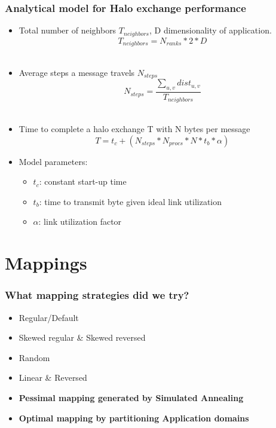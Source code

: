 \documentclass{beamer}
\begin{document}
\begin{frame}[shrink=5]
\frametitle{Analytical model for Halo exchange performance}
\begin{itemize}
\item Total number of neighbors $T_{neighbors}$, D dimensionality of application.
\begin{equation}
  T_{neighbors} = N_{ranks} * 2 * D
\end{equation} \\
\item Average steps a message travels $N_{steps}$
\begin{equation}
  N_{steps} = \frac{ \sum\limits_{u,v} dist_{u,v} } {T_{neighbors}}
\end{equation} \\
\item Time to complete a halo exchange T with N bytes per message
\begin{equation}
  T = t_c + (N_{steps} * N_{procs} * N * t_b * \alpha)
\end{equation}
\item Model parameters:
\begin{itemize}
  \item $t_c$: constant start-up time
  \item $t_b$: time to transmit byte given ideal link utilization
  \item $\alpha$: link utilization factor
\end{itemize}
\end{itemize}
\end{frame}

\section{Mappings}
\begin{frame}
\frametitle{What mapping strategies did we try?}
\begin{itemize}
\item Regular/Default
\item Skewed regular \& Skewed reversed
\item Random
\item Linear \& Reversed
\item \textbf{Pessimal mapping generated by Simulated Annealing}
\item \textbf{Optimal mapping by partitioning Application domains}
\end{itemize}
\end{frame}
\end{document}
